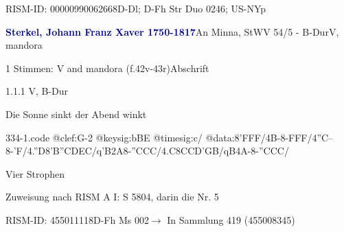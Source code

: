 \documentclass[twocolumn]{book}
\begin{document}
\par RISM-ID: 00000990062668\newline D-Dl; D-Fh  Str Duo 0246; US-NYp
\par \vspace{7pt} \textcolor{darkblue}{\textbf{Sterkel, Johann Franz Xaver  1750-1817}}\hfillplus{\textbf{[334]}}\newline An Minna, StWV 54/5 - B-Dur\newline V, mandora
\par \begin{itshape}\end{itshape} 
\par \textcolor{darkblue}{}  1 Stimmen: V and mandora  (f.42v-43r)\newline Abschrift
\par 1.1.1  V, B-Dur\newline \begin{footnotesize} Die Sonne sinkt der Abend winkt \end{footnotesize}  
\begin{filecontents*}{334-1.code}
@clef:G-2
@keysig:bBE
@timesig:c/
@data:8'FFF/4B-8-FFF/4''C--8-'F/4.''D8'B{''CD}{EC}/q'B2A8-''CCC/4.C8C{CD}{'GB}/qB4A-8-''CCC/
\end{filecontents*}
\newline
%
\par Vier Strophen
\par Zuweisung nach RISM A I: S 5804, darin die Nr. 5
\par RISM-ID: 455011118\newline D-Fh  Ms 002\newline $\rightarrow$ In Sammlung 419 (455008345)
      
\end{document}
